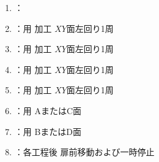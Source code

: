 \begin{enumerate}[label*=\sarrow]
\item \KIncutBoring：\IncutBoringMilling
\item \KOLeftFF：\KEndFaceBoring 用 加工 $XY$面左回り1周
\item \KOLeftFS：\KEndFaceRight\KOutcutRLeft\KKeywayConerLeft\KEndFaceOutCChamferRLeft 用 加工 $XY$面左回り1周
\item \KOLeftFSZ：\KCurvedOutcutRLeft\KEndFaceCurvedOutCChamferRLeft 用 加工 $XY$面左回り1周
\item \KILeftFF：\KEndFaceInCChamferRLeft\KIncutBoring 用 加工 $XY$面左回り1周
\item \DKLthreeAC：\DLtwoAC 用 AまたはC面 \DimpleMilling
\item \DKLthreeBD：\DLtwoBD 用 BまたはD面 \DimpleMilling
\item \OpauseCheck：各工程後 扉前移動および一時停止
\end{enumerate}



\clearpage
\modHeadsection{\TBW}


\subsection{\TBW}
